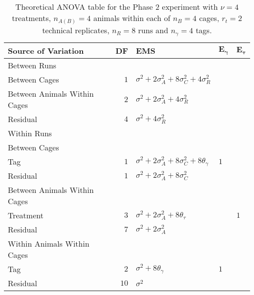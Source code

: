\begin{table}[ht]
	\caption{Theoretical ANOVA table for the Phase 2 experiment with $\nu = 4$ treatments, $n_{A(B)} = 4$ animals within each of $n_B = 4$ cages, $r_t = 2$ technical replicates, $n_R = 8$ runs and $n_\gamma = 4$ tags.}
	\begin{tabular}[t]{lrlll}
		\toprule
		\multicolumn{1}{l}{\textbf{Source of Variation}} & \multicolumn{1}{l}{\textbf{DF}} & \multicolumn{1}{l}{\textbf{EMS}}& \multicolumn{1}{l}{$\bm{E_{\gamma}}$}&\multicolumn{1}{l}{$\bm{E_{\tau}}$}\\
		\midrule
		Between Runs &  &  & & \\
		\quad Between Cages & $1$ & $\sigma^2+2\sigma_{A}^2+8\sigma_{C}^2+4\sigma_{R}^2$ & & \\
		\quad Between Animals Within Cages & $2$ & $\sigma^2+2\sigma_{A}^2+4\sigma_{R}^2$ & & \\
		\quad Residual & $4$ & $\sigma^2+4\sigma_{R}^2$ & & \\ \hline
		Within Runs &  &  & & \\
		\quad Between Cages &  &  & & \\
		\quad \quad Tag & $1$ & $\sigma^2+2\sigma_{A}^2+8\sigma_{C}^2+8\theta_{\gamma}$ &$1$ & \\
		\quad \quad Residual & $1$ & $\sigma^2+2\sigma_{A}^2+8\sigma_{C}^2$ & & \\ \hline
		\quad Between Animals Within Cages &  &  & & \\
		\quad \quad Treatment & $3$ & $\sigma^2+2\sigma_{A}^2+8\theta_{\tau}$ & & $1$\\
		\quad \quad Residual & $7$ & $\sigma^2+2\sigma_{A}^2$ & & \\ \hline
		\quad Within Animals Within Cages &  &  & & \\
		\quad \quad Tag & $2$ & $\sigma^2+8\theta_{\gamma}$ &$1$ & \\
		\quad \quad Residual & $10$ & $\sigma^2$ & & \\
		\bottomrule
	\end{tabular}
	\label{tab:Phase2ANOVA12} 
\end{table}


